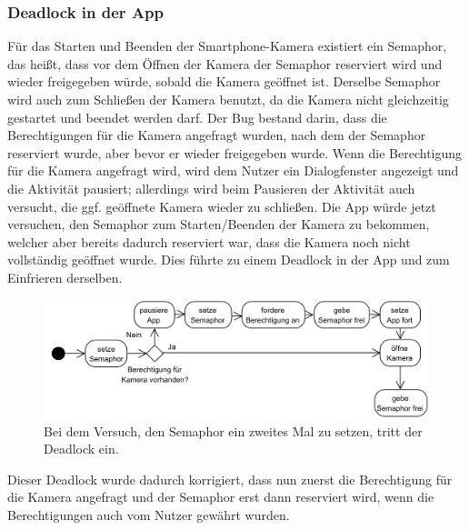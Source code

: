 \documentclass[12pt,a4paper,ngerman,enabledeprecatedfontcommands]{scrreprt}
\begin{document}
\subsubsection*{Deadlock in der \gls{App}}
Für das Starten und Beenden der Smartphone-Kamera existiert ein Semaphor, das heißt, dass vor dem Öffnen der Kamera der Semaphor reserviert wird und wieder freigegeben würde, sobald die Kamera geöffnet ist. Derselbe Semaphor wird auch zum Schließen der Kamera benutzt, da die Kamera nicht gleichzeitig gestartet und beendet werden darf. Der Bug bestand darin, dass die Berechtigungen für die Kamera angefragt wurden, nach dem der Semaphor reserviert wurde, aber bevor er wieder freigegeben wurde. Wenn die Berechtigung für die Kamera angefragt wird, wird dem Nutzer ein Dialogfenster angezeigt und die Aktivität pausiert; allerdings wird beim Pausieren der Aktivität auch versucht, die ggf. geöffnete Kamera wieder zu schließen. Die App würde jetzt versuchen, den Semaphor zum Starten/Beenden der Kamera zu bekommen, welcher aber bereits dadurch reserviert war, dass die Kamera noch nicht vollständig geöffnet wurde. Dies führte zu einem Deadlock in der App und zum Einfrieren derselben.\\

\begin{figure}[H]
\centering
\includegraphics[width=1\linewidth]{Reviewdokument/Grafiken/app_deadlock.png}
\caption{Bei dem Versuch, den Semaphor ein zweites Mal zu setzen, tritt der Deadlock ein.}
\end{figure}

Dieser Deadlock wurde dadurch korrigiert, dass nun zuerst die Berechtigung für die Kamera angefragt und der Semaphor erst dann reserviert wird, wenn die Berechtigungen auch vom Nutzer gewährt wurden.\\
\end{document}
